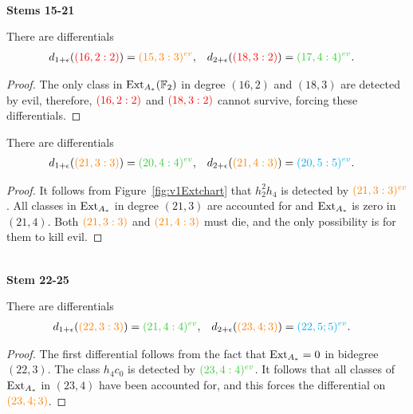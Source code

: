 \ \\
\noindent
{\bf Stems 15-21}

\begin{prop}
There are differentials
\begin{align*}
d_{1+\epsilon}({\color{red}(16,2:2)}) &= {\color{orange}(15,3:3)^{ev} } , &
d_{2+\epsilon}({\color{red}(18,3:2)})&={\color{limegreen}(17,4:4)^{ev}}.\end{align*}
\end{prop}
\begin{proof}
The only class in $\operatorname{Ext}_{A_*}(\mathbb{F}_2)$ in degree $(16,2)$ and $(18,3)$ are detected by evil, therefore, ${\color{red}(16,2:2)}$ and ${\color{red}(18,3:2)}$ cannot survive, forcing these differentials.
\end{proof}



\begin{prop}
There are differentials
\begin{align*}
d_{1+\epsilon}({\color{orange}(21,3:3)})  &= {\color{limegreen}(20,4:4)^{ev}} , & d_{2+\epsilon}({\color{orange}(21,4:3)})  &= {\color{cyan}(20,5:5)^{ev}}.\end{align*}
\end{prop}

\begin{proof}
It follows from Figure~\ref{fig:v1Extchart} that $h_2^2h_4$ is detected by $\color{orange}(21,3:3)^{ev}$. All classes in $\operatorname{Ext}_{A_*}$ in degree $(21,3)$ are accounted for and $\operatorname{Ext}_{A_*}$ is zero in $(21,4)$. Both ${\color{orange}(21,3:3)}$ and ${\color{orange}(21,4:3)}$ must die, and the only possibility is for them to kill evil.
\end{proof}


\ \\
\noindent
{\bf Stem 22-25}



\begin{prop}\label{prop:stem22_1}
There are differentials
\begin{align*}
d_{1+\epsilon}({\color{orange}(22,3:3)}) &= {\color{limegreen}(21,4:4)^{ev}} , & d_{2+\epsilon}({\color{orange}(23,4;3)}) &= {\color{cyan}(22,5;5)^{ev}}.\end{align*}
\end{prop}
\begin{proof}
The first differential follows from the fact that ${\operatorname{Ext}_{A_*}}=0$ in bidegree $(22,3)$. The class $h_4c_0$ is detected by ${\color{limegreen}(23,4:4)^{ev}}$.  It follows that all classes of $\operatorname{Ext}_{A_*}$ in $(23,4)$ have been accounted for, and this forces the differential on ${\color{orange}(23,4;3)}$.
\end{proof}


